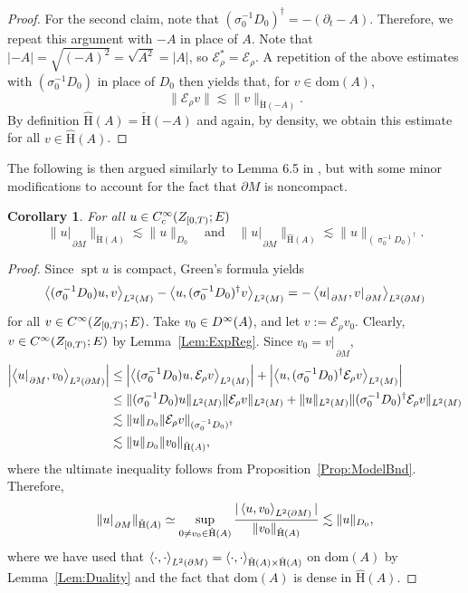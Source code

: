 \documentclass[a4paper,10pt,reqno]{amsart}
\newcommand{\sym}{\upsigma}
\newcommand{\rest}[1]{{{\lvert_{}}_{}}_{#1}}
\newcommand{\modulus}[1]{|#1|}
\newcommand{\norm}[1]{\| #1 \|}%
\newcommand{\Lp}[2][{}]{{\rm L}^{#2}_{\rm #1}}%
\newcommand{\Ck}[2][{}]{{\rm C}^{#2}_{\rm #1}}%
\newcommand{\Dk}[2][{}]{{\rm D}^{#2}_{\rm #1}}%
\newcommand{\checkH}{\check{\mathrm{H}}}
\newcommand{\hatH}{\hat{\mathrm{H}}}
\newcommand{\dom}{\mathrm{dom}}
\DeclareMathOperator{\spt}{spt}%
\newcommand{\inprod}[1]{\left\langle #1 \right\rangle}%
\newcommand{\ext}{\mathcal{E}}
\newcommand{\dM}{\partial M}
\newtheorem{corollary}[theorem]{Corollary}
\theoremstyle{definition}
\begin{document}
\begin{proof}
For the second claim, note that $(\sigma_0^{-1} D_0)^\dagger = -(\partial_t - A)$.
Therefore, we repeat this argument with $-A$ in place of $A$.
Note that $\modulus{-A}  = \sqrt{ (-A)^2} = \sqrt{A^2} = \modulus{A}$, so $\ext_\rho^\ast = \ext_\rho$.
A repetition of the above estimates with $(\sigma_0^{-1} D_0)$ in place of $D_0$ then yields that, for $v \in \dom(A)$,
$$ \norm{\ext_\rho v} \lesssim \norm{v}_{\checkH(-A)}.$$
By definition $\hatH(A) = \checkH(-A)$ and again, by density, we obtain this estimate for all $v \in \hatH(A)$.
\end{proof}

The following is then argued similarly to Lemma 6.5 in \cite{BBan}, but with some minor modifications to account for the fact that $\dM$ is noncompact.
\begin{corollary}
\label{Cor:TraceBd}
For all $u \in \Ck[c]{\infty}(Z_{[0,T)};E)$
\begin{equation*}
\norm{u\rest{\dM}}_{\checkH(A)} \lesssim \norm{u}_{D_0}\quad\text{and}\quad\norm{u\rest{\dM}}_{\hatH(A)} \lesssim \norm{u}_{(\sym_0^{-1}D_0)^\dagger}.
\end{equation*}
\end{corollary}
\begin{proof}
Since $\spt u$ is compact, Green's formula yields
$$
\inprod{(\sigma_0^{-1} D_0)u, v}_{\Lp{2}(M)} - \inprod{u, (\sigma_0^{-1} D_0)^\dagger v}_{\Lp{2}(M)} 
= 
-\inprod{u\rest{\dM},v\rest{\dM}}_{\Lp{2}(\dM)}
$$
for all $v \in \Ck{\infty}(Z_{[0,T)};E)$.
Take $v_0 \in \Dk{\infty}(A)$, and let $v := \ext_\rho v_0$.
Clearly, $v \in \Ck{\infty}(Z_{[0,T)};E)$  by Lemma~\ref{Lem:ExpReg}.
Since $v_0 = v\rest{\dM}$,
\begin{align*}
\left|\inprod{u\rest{\dM},v_0}_{\Lp{2}(\dM)}\right|
 & \leq \left|\inprod{(\sigma_0^{-1} D_0)u, \ext_\rho v}_{\Lp{2}(M)}\right| + \left| \inprod{u, (\sigma_0^{-1} D_0)^\dagger \ext_\rho v}_{\Lp{2}(M)}\right| \\
 & \leq \norm{(\sigma_0^{-1} D_0)u}_{\Lp{2}(M)} \norm{\ext_\rho v}_{\Lp{2}(M)} +  \norm{u}_{\Lp{2}(M)} \norm{(\sigma_0^{-1} D_0)^{\dagger} \ext_\rho v}_{\Lp{2}(M)}          \\
 & \lesssim \norm{u}_{D_0} \norm{\ext_\rho v}_{(\sigma_0^{-1}D_0)^\dagger}                                                    \\
 & \lesssim \norm{u}_{D_0} \norm{v_0}_{\hatH(A)},
\end{align*}
where the ultimate inequality follows from Proposition~\ref{Prop:ModelBnd}.
Therefore,
$$ \norm{u\rest{\dM}}_{\checkH(A)}
\simeq \sup_{0 \neq v_0 \in \hatH(A)} \frac{\modulus{ \inprod{u,v_0}_{\Lp{2}(\dM)}}}{\norm{v_0}_{\hatH(A)}}
\lesssim \norm{u}_{D_0},$$
where we have used that $\inprod{\cdot,\cdot}_{\Lp{2}(\dM)} = \inprod{\cdot,\cdot}_{\checkH(A) \times \hatH(A)}$ on $\dom(A)$ by Lemma~\ref{Lem:Duality} and the fact that $\dom(A)$ is dense in  $\hatH(A)$.
\end{proof}
\end{document}
